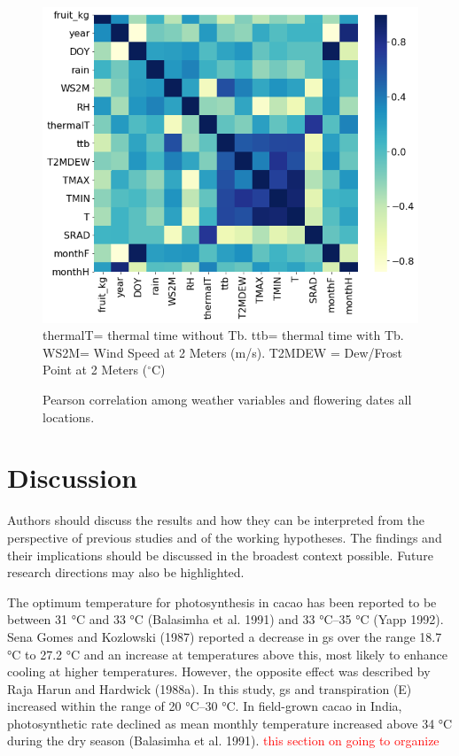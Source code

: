 \documentclass[gene,journal,article,submit,moreauthors,pdftex]{Definitions/mdpi}
\begin{document}
\begin{figure}[h!]
	\centering
	\caption{\footnotesize {Pearson correlation among weather variables and flowering dates all locations. \\}} 
	\includegraphics[scale=0.4]{images/heatm.png}\\
	\label{fig:heat}
	{\footnotesize thermalT= thermal time without Tb. ttb= thermal time with Tb. WS2M= Wind Speed at 2 Meters (m/s). T2MDEW = Dew/Frost Point at 2 Meters ($^\circ$C) }
\end{figure}
\newpage


\section{Discussion}
Authors should discuss the results and how they can be interpreted from the perspective of previous studies and of the working hypotheses. The findings and their implications should be discussed in the broadest context possible. Future research directions may also be highlighted.


The optimum temperature for photosynthesis in cacao has
been reported to be between 31 °C and 33 °C (Balasimha et al.
1991) and 33 °C–35 °C (Yapp 1992). Sena Gomes and
Kozlowski (1987) reported a decrease in gs over the range
18.7 °C to 27.2 °C and an increase at temperatures above this,
most likely to enhance cooling at higher temperatures.
However, the opposite effect was described by Raja Harun
and Hardwick (1988a). In this study, gs and transpiration (E)
increased within the range of 20 °C–30 °C. In field-grown
cacao in India, photosynthetic rate declined as mean monthly
temperature increased above 34 °C during the dry season
(Balasimha et al. 1991). \cite{lahive2019}
\textcolor{red}{this section on going to organize}
\end{document}
